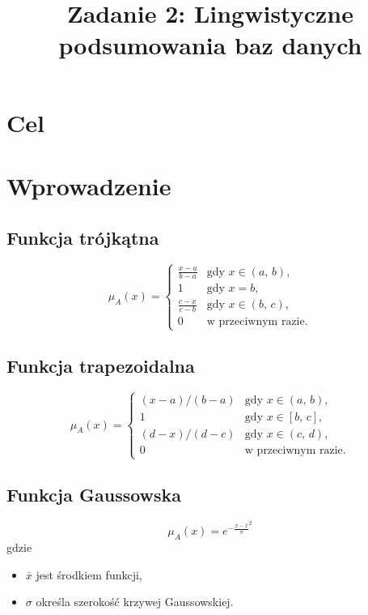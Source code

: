 \documentclass{classrep}
\author{
	\studentinfo{Radosław Grela}{216769} \and
	\studentinfo{Jakub Wąchała}{216914} 
}
\title{Zadanie 2: Lingwistyczne podsumowania baz danych}
\begin{document}
	\maketitle
	
	\section{Cel} %
	
	
	\section{Wprowadzenie} %
	
	\subsection{Funkcja trójkątna}
	

\[\mu_A(x) = \begin{cases}
\frac{x-a}{b-a} & \mbox{gdy } x \in (a,\, b), \\
1                 & \mbox{gdy } x = b, \\
\frac{c-x}{c-b} & \mbox{gdy } x \in (b,\, c), \\
0                 & \mbox{w przeciwnym razie}.
\end{cases}\]
	\subsection{Funkcja trapezoidalna}

\[\mu_A(x) = \begin{cases}
(x - a) / (b - a) & \mbox{gdy } x \in (a,\, b), \\
1                 & \mbox{gdy } x \in [b,\, c], \\
(d - x) / (d - c) & \mbox{gdy } x \in (c,\, d), \\
0                 & \mbox{w przeciwnym razie}.
\end{cases}\]
	
	
	\subsection{Funkcja Gaussowska \cite{kul}} 
\begin{equation}
	\mu_A(x) = e^{-\frac{x - \bar{x}}{\sigma}^2}
\end{equation}
gdzie 
\begin{itemize}
	\item $\bar{x}$ jest środkiem funkcji,
	\item $\sigma$ określa szerokość krzywej Gaussowskiej. 
\end{itemize}
	
\end{document}
